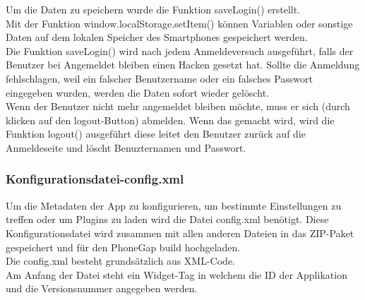 Um die Daten zu speichern wurde die Funktion saveLogin() erstellt.\\




Mit der Funktion window.localStorage.setItem() können Variablen oder sonstige Daten auf dem lokalen Speicher des Smartphones gespeichert werden.\\
 Die Funktion saveLogin() wird nach jedem Anmeldeversuch ausgeführt, falls der Benutzer bei Angemeldet bleiben einen Hacken gesetzt hat. Sollte die Anmeldung fehlschlagen, weil ein falscher Benutzername oder ein falsches Passwort eingegeben wurden, werden die Daten sofort wieder gelöscht.\\
Wenn der Benutzer nicht mehr angemeldet bleiben möchte, muss er sich (durch klicken auf den logout-Button) abmelden. Wenn das gemacht wird, wird die Funktion logout() ausgeführt diese leitet den Benutzer zurück auf die Anmeldeseite und löscht Benuzternamen und Passwort.\\



\subsubsection{Konfigurationsdatei-config.xml}

Um die Metadaten der App zu konfigurieren, um bestimmte Einstellungen zu treffen oder um Plugins zu laden wird die Datei config.xml benötigt. Diese Konfigurationsdatei wird zusammen mit allen anderen Dateien in das ZIP-Paket gespeichert und für den PhoneGap build hochgeladen.\\
Die config.xml besteht grundsätzlich aus XML-Code.\\
Am Anfang der Datei steht ein Widget-Tag in welchem die ID der Applikation und die Versionsnummer angegeben werden.\\
 



